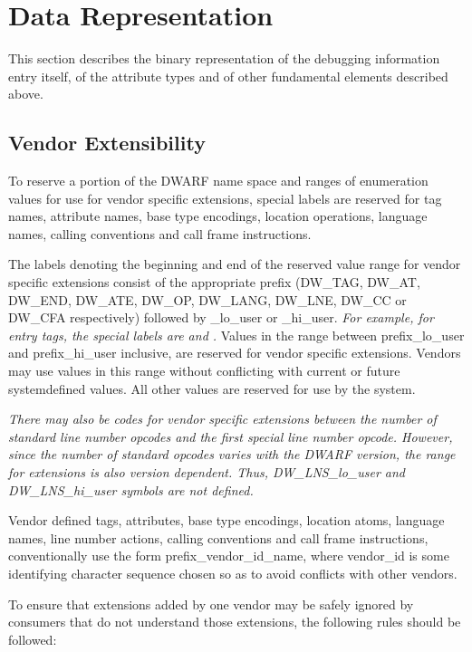 \chapter{Data Representation}
\label{datarep:datarepresentation}

This section describes the binary representation of the
debugging information entry itself, of the attribute types
and of other fundamental elements described above.


\section{Vendor Extensibility}
\label{datarep:vendorextensibility}

To reserve a portion of the DWARF name space and ranges of
enumeration values for use for vendor specific extensions,
special labels are reserved for tag names, attribute names,
base type encodings, location operations, language names,
calling conventions and call frame instructions.

The labels denoting the beginning and end of the reserved
value range for vendor specific extensions consist of the
appropriate prefix (DW\_TAG, DW\_AT, DW\_END, DW\_ATE, DW\_OP,
DW\_LANG, DW\_LNE, DW\_CC or DW\_CFA respectively) followed by
\_lo\_user or \_hi\_user. 
\textit{For example, for entry tags, the special
labels are  and 
.}
Values in the
range between prefix\_lo\_user and prefix\_hi\_user inclusive,
are reserved for vendor specific extensions. Vendors may
use values in this range without conflicting with current or
future system\dash defined values. All other values are reserved
for use by the system.

\textit{There may also be codes for vendor specific extensions
between the number of standard line number opcodes and
the first special line number opcode. However, since the
number of standard opcodes varies with the DWARF version,
the range for extensions is also version dependent. Thus,
DW\_LNS\_lo\_user and DW\_LNS\_hi\_user symbols are not defined.}

Vendor defined tags, attributes, base type encodings, location
atoms, language names, line number actions, calling conventions
and call frame instructions, conventionally use the form
prefix\_vendor\_id\_name, where vendor\_id is some identifying
character sequence chosen so as to avoid conflicts with
other vendors.

To ensure that extensions added by one vendor may be safely
ignored by consumers that do not understand those extensions,
the following rules should be followed:

